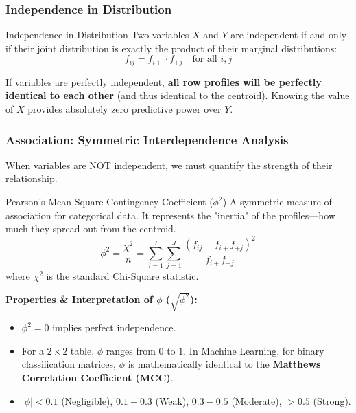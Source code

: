 \subsubsection*{Independence in Distribution}

\begin{defbox}{Independence in Distribution}
Two variables $X$ and $Y$ are independent if and only if their joint distribution is exactly the product of their marginal distributions:
\begin{equation}
    f_{ij} = f_{i+} \cdot f_{+j} \quad \text{for all } i, j
\end{equation}
\end{defbox}

If variables are perfectly independent, \textbf{all row profiles will be perfectly identical to each other} (and thus identical to the centroid). Knowing the value of $X$ provides absolutely zero predictive power over $Y$.

\subsubsection{Association: Symmetric Interdependence Analysis}

When variables are NOT independent, we must quantify the strength of their relationship.

\begin{defbox}{Pearson's Mean Square Contingency Coefficient ($\phi^2$)}
A symmetric measure of association for categorical data. It represents the "inertia" of the profiles—how much they spread out from the centroid.
\begin{equation}
    \phi^2 = \frac{\chi^2}{n} = \sum_{i=1}^{I} \sum_{j=1}^{J} \frac{(f_{ij} - f_{i+}f_{+j})^2}{f_{i+}f_{+j}}
\end{equation}
where $\chi^2$ is the standard Chi-Square statistic.
\end{defbox}

\textbf{Properties \& Interpretation of $\phi$ ($\sqrt{\phi^2}$):}
\begin{itemize}
    \item $\phi^2 = 0$ implies perfect independence.
    \item For a $2 \times 2$ table, $\phi$ ranges from $0$ to $1$. In Machine Learning, for binary classification matrices, $\phi$ is mathematically identical to the \textbf{Matthews Correlation Coefficient (MCC)}.
    \item $|\phi| < 0.1$ (Negligible), $0.1 - 0.3$ (Weak), $0.3 - 0.5$ (Moderate), $> 0.5$ (Strong).
\end{itemize}

